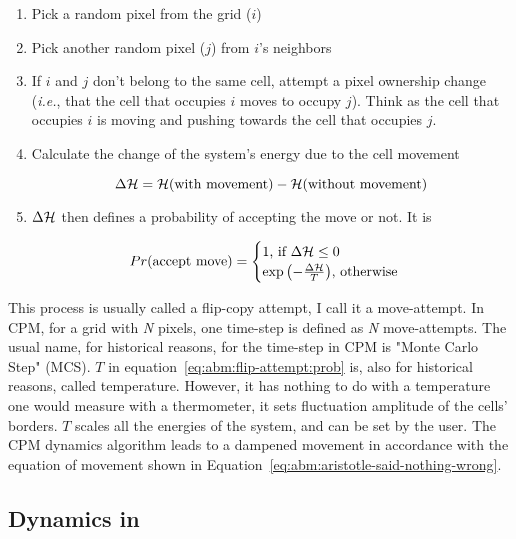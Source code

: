 \begin{enumerate}
    \item Pick a random pixel from the grid ($i$)
    \item Pick another random pixel ($j$) from $i$'s neighbors
    \item If $i$ and $j$ don't belong to the same cell, attempt a pixel ownership change (\textit{i.e.}, that the cell that occupies $i$ moves to occupy $j$). Think as the cell that occupies $i$ is moving and pushing towards the cell that occupies $j$. 
    \item Calculate the change of the system's energy due to the cell movement
    
    \begin{equation}\label{eq:abm:flip-attempt:delta}
        \Delta \mathcal{H} = \mathcal{H}(\text{with movement}) - \mathcal{H}(\text{without movement})
    \end{equation}
    
    \item $\Delta \mathcal{H}$ then defines a probability of accepting the move or not. It is
    
    \begin{equation}\label{eq:abm:flip-attempt:prob}
        Pr(\text{accept move}) = \begin{cases}
        1\text{, if } \Delta \mathcal{H} \leq 0\\
        \exp{\left(-\frac{\Delta \mathcal{H}}{T}\right)}\text{, otherwise}
        \end{cases}
    \end{equation}
\end{enumerate}

This process is usually called a flip-copy attempt, I call it a move-attempt. In CPM, for a grid with \textit{N} pixels, one time-step is defined as \textit{N} move-attempts. The usual name, for historical reasons, for the time-step in CPM is "Monte Carlo Step" (MCS). $T$ in equation~\ref{eq:abm:flip-attempt:prob} is, also for historical reasons, called temperature. However, it has nothing to do with a temperature one would measure with a thermometer, it sets fluctuation amplitude of the cells' borders. $T$ scales all the energies of the system, and can be set by the user.
The CPM dynamics algorithm leads to a dampened movement in accordance with the equation of movement shown in Equation~\ref{eq:abm:aristotle-said-nothing-wrong}. 

\subsection{Dynamics in \psc}\label{sec:abm:center}

